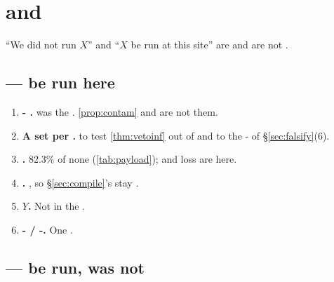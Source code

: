 \section{ and  }
\label{sec:limits}

``We did not run $X$'' and ``$X$  be run at this site'' are 
 and are not .

\subsection{ ---  be run here}

\begin{enumerate}
\item \textbf{-  .}   was  
       the . \cref{prop:contam}   and 
      are not   them.
\item \textbf{A   set per .}  to test
      \cref{thm:vetoinf} out of  and to  the -
       of §\ref{sec:falsify}(6).
\item \textbf{ .} $82.3\%$ of   none
      (\cref{tab:payload});  and  loss are  here.
\item \textbf{ .} , so §\ref{sec:compile}'s  
      stay .
\item \textbf{$Y$.} Not in the .
\item \textbf{- / -.} One  .
\end{enumerate}

\subsection{ ---  be run, was not}

